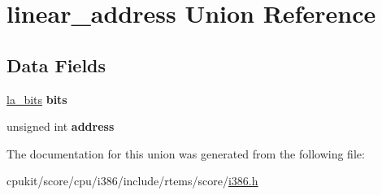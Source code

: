 \hypertarget{unionlinear__address}{}\section{linear\+\_\+address Union Reference}
\label{unionlinear__address}
\subsection*{Data Fields}
\begin{DoxyCompactItemize}
\item 
\mbox{\label{unionlinear__address_accba871761ba0ccb78ef0ee9a5d5db5c}} 
\mbox{\hyperlink{structla__bits}{la\+\_\+bits}} {\bfseries bits}
\item 
\mbox{\label{unionlinear__address_a5d55cf3cc33a617a09327a858a527020}} 
unsigned int {\bfseries address}
\end{DoxyCompactItemize}


The documentation for this union was generated from the following file\+:\begin{DoxyCompactItemize}
\item 
cpukit/score/cpu/i386/include/rtems/score/\mbox{\hyperlink{i386_8h}{i386.\+h}}\end{DoxyCompactItemize}
